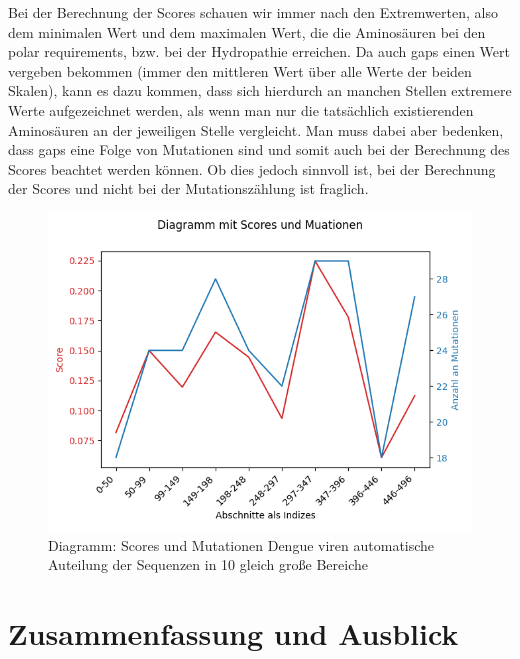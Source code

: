 \documentclass[german,version-2022-01]{uzl-thesis}
\begin{document}
Bei der Berechnung der Scores schauen wir immer nach den Extremwerten, also dem minimalen Wert und dem maximalen Wert, die die Aminos\"auren bei den polar requirements, bzw. bei der Hydropathie erreichen. Da auch gaps einen Wert vergeben bekommen (immer den mittleren Wert \"uber alle Werte der beiden Skalen), kann es dazu kommen, dass sich hierdurch an manchen Stellen extremere Werte aufgezeichnet werden, als wenn man nur die tats\"achlich existierenden Aminos\"auren an der jeweiligen Stelle vergleicht. Man muss dabei aber bedenken, dass gaps eine Folge von Mutationen sind und somit auch bei der Berechnung des Scores beachtet werden k\"onnen. Ob dies jedoch sinnvoll ist, bei der Berechnung der Scores und nicht bei der Mutationsz\"ahlung ist fraglich. 

\begin{figure}[htpb]
  \centering
  \includegraphics[scale=0.75]{Images/Diagramm_Scores_und_Mutationen_Dengue_viren.png}
  \caption{Diagramm: Scores und Mutationen Dengue viren automatische Auteilung der Sequenzen in 10 gleich gro\ss{}e Bereiche}
  \label{fig:Dengue_virus_scores_and_mutations}
\end{figure}

\chapter{Zusammenfassung und Ausblick}
\end{document}

